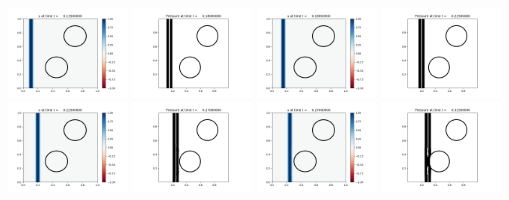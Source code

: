 \documentclass[11pt]{article}
\begin{document}
\includegraphics[width=0.2375\textwidth]{frame0003fig1.png}
\vskip 10pt 
\includegraphics[width=0.2375\textwidth]{frame0004fig0.png}
\includegraphics[width=0.2375\textwidth]{frame0004fig1.png}
\includegraphics[width=0.2375\textwidth]{frame0005fig0.png}
\includegraphics[width=0.2375\textwidth]{frame0005fig1.png}
\vskip 10pt 
\includegraphics[width=0.2375\textwidth]{frame0006fig0.png}
\includegraphics[width=0.2375\textwidth]{frame0006fig1.png}
\includegraphics[width=0.2375\textwidth]{frame0007fig0.png}
\end{document}
